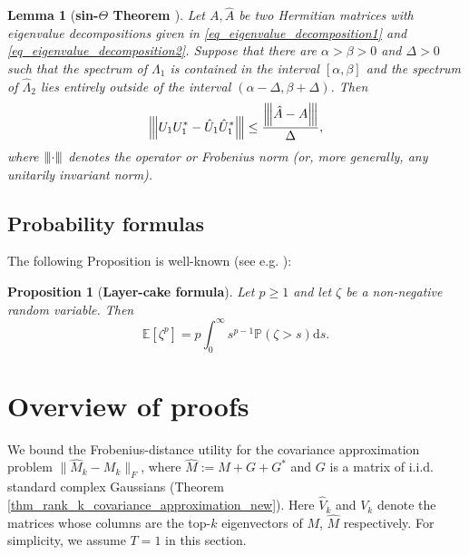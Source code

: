 \documentclass[11pt,letterpaper]{article}
\newtheorem{lemma}[theorem]{Lemma}
\newtheorem{proposition}[theorem]{Proposition}
\begin{document}
\begin{lemma}[\bf sin-$\Theta$ Theorem \cite{davis1970rotation}] \label{lemma_SinTheta}
Let $A, \hat{A}$ be two Hermitian matrices with eigenvalue decompositions given in \eqref{eq_eigenvalue_decomposition1} and \eqref{eq_eigenvalue_decomposition2}.
%
Suppose that there are $\alpha > \beta>0$ and $\Delta>0$ such that the spectrum of $\Lambda_1$ is contained in the interval $[\alpha, \beta]$ and the spectrum of $\hat{\Lambda}_2$ lies entirely outside of the interval $(\alpha -\Delta, \beta + \Delta)$.
%
Then
%
\newcommand{\vertiii}[1]{{\left\vert\kern-0.25ex\left\vert\kern-0.25ex\left\vert #1 
    \right\vert\kern-0.25ex\right\vert\kern-0.25ex\right\vert}}
%
\begin{equation*}
    \vertiii{U_1 U_1^\ast - \hat{U}_1 \hat{U}_1^\ast}  \leq \frac{\vertiii{\hat{A}- A}}{\Delta},
\end{equation*}
%
where $\vertiii{\cdot}$ denotes the operator or Frobenius norm (or, more generally, any unitarily invariant norm).
\end{lemma}

\subsection{Probability formulas} 

The following Proposition is well-known (see e.g. \cite{corwin2024lower}):
%
\begin{proposition}[\bf Layer-cake formula]\label{lemma_layer_cake}
Let  $p \geq 1$ and let $\zeta$ be a non-negative random variable.
%
Then
\begin{equation*}
\mathbb{E}[\zeta^p] = p\int_{0}^\infty s^{p-1}\mathbb{P}(\zeta > s) \mathrm{d}s.
\end{equation*}
\end{proposition}

\color{black}


\section{Overview of proofs}\label{sec_technical_overview}


%
We bound the Frobenius-distance utility for the covariance approximation problem $\|\hat{M}_k - M_k\|_F$,  
where $\hat{M}:= M + G + G^\ast$ and $G$ is a matrix of i.i.d. standard complex Gaussians (Theorem \ref{thm_rank_k_covariance_approximation_new}).
%
Here $\hat{V}_k$ and $V_k$ denote the matrices whose columns are the top-$k$ eigenvectors of $M$, $\hat{M}$ respectively.  
For simplicity, we assume $T=1$ in this section.
\end{document}
